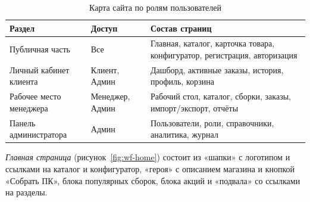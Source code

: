 \documentclass[14pt, a4paper]{extarticle}
\begin{document}
\begin{table}[ht!]
\caption{Карта сайта по ролям пользователей}
\label{tab:sitemap}
\small
\begin{tabularx}{\textwidth}{|>{\RaggedRight\arraybackslash}p{}|>{\RaggedRight\arraybackslash}p{}|>{\RaggedRight\arraybackslash}X|}
\hline
\textbf{Раздел} & \textbf{Доступ} & \textbf{Состав страниц} \\ \hline
Публичная часть & Все & Главная, каталог, карточка товара, конфигуратор, регистрация, авторизация \\ \hline
Личный кабинет клиента & Клиент, Админ & Дашборд, активные заказы, история, профиль, корзина \\ \hline
Рабочее место менеджера & Менеджер, Админ & Рабочий стол, каталог, сборки, заказы, импорт/экспорт, отчёты \\ \hline
Панель администратора & Админ & Пользователи, роли, справочники, аналитика, журнал \\ \hline
\end{tabularx}
\end{table}

\emph{Главная страница} (рисунок~\ref{fig:wf-home}) состоит из «шапки» с логотипом и ссылками на каталог и конфигуратор, «героя» с описанием магазина и кнопкой «Собрать ПК», блока популярных сборок, блока акций и «подвала» со ссылками на разделы.
\end{document}
